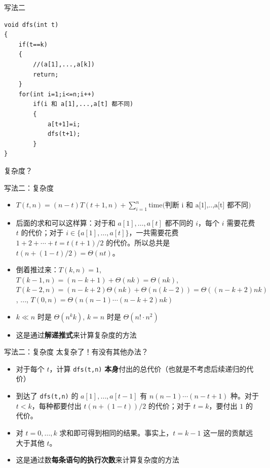 \documentclass[11pt,aspectratio=169]{beamer}
\begin{document}
\begin{frame}[fragile]{写法二}
\begin{lstlisting}
void dfs(int t)
{
    if(t==k)
    {
        //(a[1],...,a[k])
        return;
    }
    for(int i=1;i<=n;i++)
        if(i 和 a[1],...,a[t] 都不同)
        {
            a[t+1]=i;
            dfs(t+1);
        }
}
\end{lstlisting}

复杂度？
\end{frame}
\begin{frame}{写法二：复杂度}
    \begin{itemize}
        \item $T(t,n)=(n-t)T(t+1,n)+\sum_{i=1}^n\text{time(判断 i 和 a[1],..,a[t] 都不同)}$
        \item 后面的求和可以这样算：对于和 $a[1],\ldots,a[t]$ 都不同的 $i$，每个 $i$ 需要花费 $t$ 的代价；对于 $i\in\{a[1],\ldots,a[t]\}$，一共需要花费 $1+2+\cdots+t=t(t+1)/2$ 的代价。所以总共是 $t(n+(1-t)/2)=\Theta(nt)$。
        \item 倒着推过来：$T(k,n)=1$, $T(k-1,n)=(n-k+1)+\Theta(nk)=\Theta(nk)$, $T(k-2,n)=(n-k+2)\Theta(nk)+\Theta(n(k-2))=\Theta((n-k+2)nk)$, ..., $T(0,n)=\Theta(n(n-1)\cdots (n-k+2)nk)$
        \item $k\ll n$ 时是 $\Theta(n^{k}k)$, $k=n$ 时是 $\Theta(n!\cdot n^2)$
        \item     这是通过\textbf{解递推式}来计算复杂度的方法
    \end{itemize}
\end{frame}

\begin{frame}{写法二：复杂度}
    太复杂了！有没有其他办法？

    \begin{itemize}
        \item 对于每个 $t$，计算 \texttt{dfs(t,n)} \textbf{本身}付出的总代价（也就是不考虑后续递归的代价）
        \item     到达了 \texttt{dfs(t,n)} 的 $a[1],\ldots, a[t-1]$ 有 $n(n-1)\cdots (n-t+1)$ 种。对于 $t<k$，每种都要付出 $t(n+(1-t))/2$ 的代价；对于 $t=k$，要付出 $1$ 的代价。
        \item 对 $t=0,\ldots,k$ 求和即可得到相同的结果。事实上，$t=k-1$ 这一层的贡献远大于其他 $t$。
        \item  这是通过数\textbf{每条语句的执行次数}来计算复杂度的方法
    \end{itemize}
\end{frame}
\end{document}
